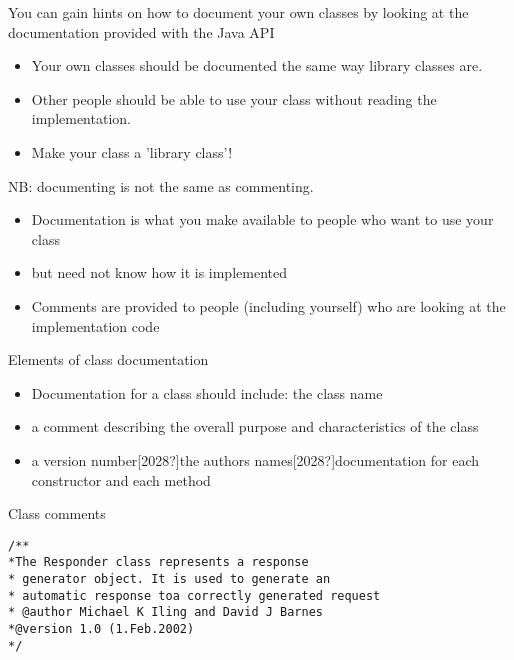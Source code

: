 \documentclass{beamer}
\begin{document}
\begin{frame}

You can gain hints on how to document your own classes by looking at the documentation provided with the Java API

\begin{itemize}
\item Your own classes should be documented the same way library classes are.
\item Other people should be able to use your class without reading the implementation.
\item Make your class a 'library class'!
\end{itemize}

\end{frame} \begin{frame}

NB: documenting is not the same as commenting. 

\begin{itemize}
\item Documentation is what you make available to people who want to use your class 
\item but need not know how it is implemented
\item Comments are provided to people (including yourself) who are looking at the implementation code \ 
\end{itemize}
\end{frame}
\begin{frame}
Elements of class documentation

\begin{itemize}
\item Documentation for a class should include: the class name
\item a comment describing the overall purpose and characteristics of the class
\item a version number[2028?]the authors names[2028?]documentation for each constructor and each method
\end{itemize}
\end{frame} 

\begin{frame}[fragile]
Class comments
\begin{block}{}
\begin{lstlisting}
/**
*The Responder class represents a response
* generator object. It is used to generate an
* automatic response toa correctly generated request
* @author Michael K Iling and David J Barnes
*@version 1.0 (1.Feb.2002)
*/
\end{lstlisting}
\end{block}
\end{frame} 
\end{document}
